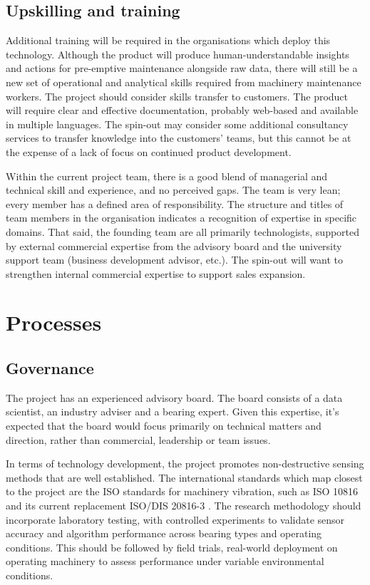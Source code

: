 \documentclass[runningheads]{llncs}
\begin{document}
\subsection{Upskilling and training}
    Additional training will be required in the organisations which deploy this technology. Although the product will produce human-understandable insights and actions for pre-emptive maintenance alongside raw data, there will still be a new set of operational and analytical skills required from machinery maintenance workers. The project should consider skills transfer to customers. The product will require clear and effective documentation, probably web-based and available in multiple languages. The spin-out may consider some additional consultancy services to transfer knowledge into the customers' teams, but this cannot be at the expense of a lack of focus on continued product development.
    
    Within the current project team, there is a good blend of managerial and technical skill and experience, and no perceived gaps. The team is very lean; every member has a defined area of responsibility. The structure and titles of team members in the organisation indicates a recognition of expertise in specific domains. That said, the founding team are all primarily technologists, supported by external commercial expertise from the advisory board and the university support team (business development advisor, etc.). The spin-out will want to strengthen internal commercial expertise  to support sales expansion.
\section{Processes}
\subsection{Governance}
    The project has an experienced advisory board. The board consists of a data scientist, an industry adviser and a bearing expert. Given this expertise, it's expected that the board would focus primarily on technical matters and direction, rather than commercial, leadership or team issues.

    In terms of technology development, the project promotes non-destructive sensing methods that are well established. The international standards which map closest to the project are the ISO standards for machinery vibration, such as ISO 10816 and its current replacement ISO/DIS 20816-3 \cite{for_2025}. The research methodology should incorporate laboratory testing, with controlled experiments to validate sensor accuracy and algorithm performance across bearing types and operating conditions. This should be followed by field trials, real-world deployment on operating machinery to assess performance under variable environmental conditions. 
\end{document}
